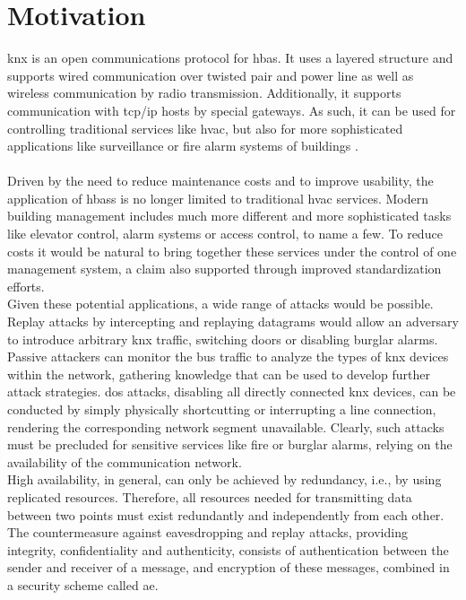 \section{Motivation}

\gls{knx} is an open communications protocol for \gls{hbas}.
It uses a layered structure and supports wired communication over twisted pair
and power line as well as wireless communication by radio transmission. 
Additionally, it supports communication with \gls{tcp}/\gls{ip} hosts by special gateways. 
As such, it can be used for controlling traditional services like \gls{hvac}, but also for more
sophisticated applications like surveillance or fire alarm systems of buildings \cite{knxapps}.
\\
\\
Driven by the need to reduce maintenance costs and to improve usability, the application of \glspl{hbas} is no longer limited to traditional \gls{hvac} services.
Modern building management includes much more different and more sophisticated tasks like elevator control, alarm systems or access control, to name a few.
To reduce costs it would be natural to bring together these services under the control of one management system, a claim also supported through improved 
standardization efforts.
\\
Given these potential applications, a wide range of attacks would be possible. 
Replay attacks by intercepting and replaying datagrams would allow an adversary to introduce arbitrary \gls{knx} traffic, switching doors
or disabling burglar alarms. Passive attackers can monitor the bus traffic to analyze the types of \gls{knx} devices within the network, gathering knowledge that can be used
to develop further attack strategies.
\gls{dos} attacks, disabling all directly connected \gls{knx} devices, can be conducted by simply physically shortcutting or interrupting a line
connection, rendering the corresponding network segment unavailable. Clearly, such attacks must be precluded for sensitive services like fire or burglar alarms,
relying on the availability of the communication network.
\\
High availability, in general, can only be achieved by redundancy, i.e., by using replicated resources. Therefore, all
resources needed for transmitting data between two points must exist redundantly and independently from each other.
\\
The countermeasure against eavesdropping and replay attacks, providing integrity, confidentiality and authenticity, consists of authentication
between the sender and receiver of a message, and encryption of these messages, combined in a security scheme called \gls{ae}.
